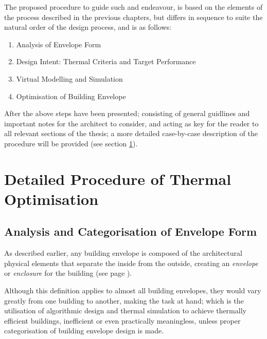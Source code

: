 The proposed procedure to guide such and endeavour, is based on the elements of the process described in the previous chapters, but differs in sequence to suite the natural order of the design process, and is as follows:

\begin{enumerate}
	\item Analysis of Envelope Form
	\item Design Intent: Thermal Criteria and Target Performance
	\item Virtual Modelling and Simulation
	\item Optimisation of Building Envelope
\end{enumerate}

After the above steps have been presented; consisting of general guidlines and important notes for the architect to consider, and acting as key for the reader to all relevant sections of the thesis; a more detailed case-by-case description of the procedure will be provided (see section \ref{sec:DetailedProcedure}).

\clearpage

\colorbox{90Gray}{
	\begin{minipage}{0.9\textwidth}
	
	\end{minipage}
}

\clearpage

\section{Detailed Procedure of Thermal Optimisation}
\label{sec:DetailedProcedure}

\subsection{Analysis and Categorisation of Envelope Form}

As described earlier, any building envelope is composed of the architectural physical elements that separate the inside from the outside, creating an \emph{envelope} or \emph{enclosure} for the building (see page \pageref{BuildEnvDef}).

Although this definition applies to almost all building envelopes, they would vary greatly from one building to another, making the task at hand; which is the utilisation of algorithmic design and thermal simulation to achieve thermally efficient buildings, inefficient or even practically meaningless, unless proper categorisation of building envelope design is made.

